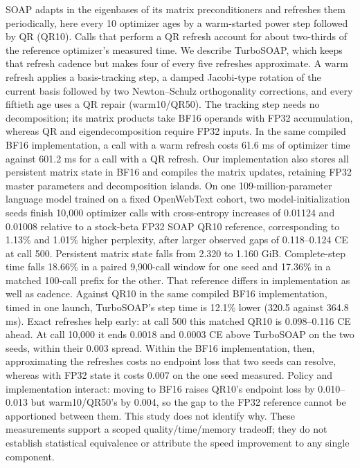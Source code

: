 SOAP adapts in the eigenbases of its matrix preconditioners and
refreshes them periodically, here every 10 optimizer ages by a
warm-started power step followed by QR (QR10). Calls that perform a QR
refresh account for about two-thirds of the reference optimizer's
measured time. We describe TurboSOAP, which keeps that refresh cadence
but makes four of every five refreshes approximate. A warm refresh
applies a basis-tracking step, a damped Jacobi-type rotation of the
current basis followed by two Newton--Schulz orthogonality corrections,
and every fiftieth age uses a QR repair (warm10/QR50). The tracking step
needs no decomposition; its matrix products take BF16 operands with
FP32 accumulation, whereas QR and eigendecomposition require FP32
inputs. In the same compiled BF16 implementation, a call with a warm
refresh costs 61.6 ms of optimizer time against 601.2 ms for a call
with a QR refresh. Our implementation also stores all persistent matrix
state in BF16 and compiles the matrix updates, retaining FP32 master
parameters and decomposition islands. On one 109-million-parameter
language model trained on a fixed OpenWebText cohort, two
model-initialization seeds finish 10,000 optimizer calls with
cross-entropy increases of 0.01124 and 0.01008 relative to a stock-beta
FP32 SOAP QR10 reference, corresponding to 1.13\% and 1.01\% higher
perplexity, after larger observed gaps of 0.118--0.124 CE at call 500.
Persistent matrix state falls from 2.320 to 1.160 GiB. Complete-step
time falls 18.66\% in a paired 9,900-call window for one seed and
17.36\% in a matched 100-call prefix for the other. That reference
differs in implementation as well as cadence. Against QR10 in the same
compiled BF16 implementation, timed in one launch, TurboSOAP's step
time is 12.1\% lower (320.5 against 364.8 ms). Exact refreshes help early: at
call 500 this matched QR10 is 0.098--0.116 CE ahead. At call 10,000 it
ends 0.0018 and 0.0003 CE above TurboSOAP on the two seeds, within
their 0.003 spread. Within the BF16 implementation, then, approximating
the refreshes costs no endpoint loss that two seeds can resolve,
whereas with FP32 state it costs 0.007 on the one seed measured. Policy
and implementation interact: moving to BF16 raises QR10's endpoint loss
by 0.010--0.013 but warm10/QR50's by 0.004, so the gap to the FP32
reference cannot be apportioned between them. This study does not
identify why. These measurements support a scoped
quality/time/memory tradeoff; they do not establish statistical
equivalence or attribute the speed improvement to any single
component.
